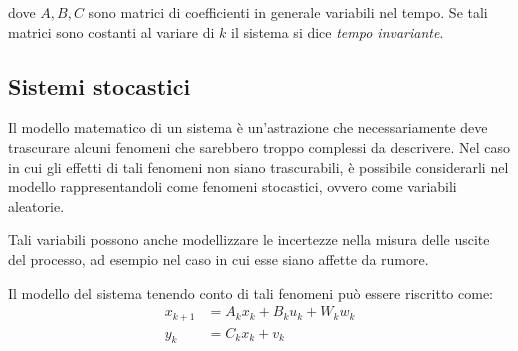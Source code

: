 dove $A,B,C$ sono matrici di coefficienti in generale variabili nel tempo. Se tali matrici sono costanti al variare di $k$ il sistema si dice \textit{tempo invariante}.
\newpage
\subsection{Sistemi stocastici}

Il modello matematico di un sistema è un'astrazione che necessariamente deve trascurare alcuni fenomeni che sarebbero troppo complessi da descrivere. Nel caso in cui gli effetti di tali fenomeni non siano trascurabili, è possibile considerarli nel modello rappresentandoli come fenomeni stocastici, ovvero come variabili aleatorie.

Tali variabili possono anche modellizzare le incertezze nella misura delle uscite del processo, ad esempio nel caso in cui esse siano affette da rumore.

Il modello del sistema tenendo conto di tali fenomeni può essere riscritto come:
\begin{subequations}
\label{rumlinsys}
\begin{align}\label{rumlinsys1}
x_{k+1} &= A_kx_k + B_ku_k + W_kw_k \\
\label{rumlinsys2}
y_k &= C_kx_k + v_k
\end{align}
\end{subequations}

